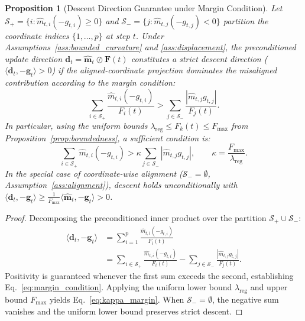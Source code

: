 \documentclass[11pt,a4paper]{article}
\newtheorem{proposition}{Proposition}
\begin{document}
\begin{proposition}[Descent Direction Guarantee under Margin Condition]
\label{prop:descent}
Let $\mathcal{S}_+ = \{i : \hat{m}_{t,i}(-g_{t,i}) \ge 0\}$ and $\mathcal{S}_- = \{j : \hat{m}_{t,j}(-g_{t,j}) < 0\}$ partition the coordinate indices $\{1, \dots, p\}$ at step $t$. Under Assumptions~\ref{ass:bounded_curvature} and \ref{ass:displacement}, the preconditioned update direction $\mathbf{d}_t = \hat{\mathbf{m}}_t \oslash \mathbf{F}(t)$ constitutes a strict descent direction ($\langle \mathbf{d}_t, -\mathbf{g}_t \rangle > 0$) if the aligned-coordinate projection dominates the misaligned contribution according to the margin condition:
\begin{equation}
\sum_{i \in \mathcal{S}_+} \frac{\hat{m}_{t,i} (-g_{t,i})}{F_i(t)} > \sum_{j \in \mathcal{S}_-} \frac{|\hat{m}_{t,j} g_{t,j}|}{F_j(t)}.
\label{eq:margin_condition}
\end{equation}
In particular, using the uniform bounds $\lambda_{\text{reg}} \le F_k(t) \le F_{\max}$ from Proposition~\ref{prop:boundedness}, a sufficient condition is:
\begin{equation}
\sum_{i \in \mathcal{S}_+} \hat{m}_{t,i} (-g_{t,i}) > \kappa \sum_{j \in \mathcal{S}_-} |\hat{m}_{t,j} g_{t,j}|, \qquad \kappa = \frac{F_{\max}}{\lambda_{\text{reg}}}.
\label{eq:kappa_margin}
\end{equation}
In the special case of coordinate-wise alignment ($\mathcal{S}_- = \emptyset$, Assumption~\ref{ass:alignment}), descent holds unconditionally with $\langle \mathbf{d}_t, -\mathbf{g}_t \rangle \ge \frac{1}{F_{\max}} \langle \hat{\mathbf{m}}_t, -\mathbf{g}_t \rangle > 0$.
\end{proposition}

\begin{proof}
Decomposing the preconditioned inner product over the partition $\mathcal{S}_+ \cup \mathcal{S}_-$:
\begin{align}
\langle \mathbf{d}_t, -\mathbf{g}_t \rangle &= \sum_{i=1}^p \frac{\hat{m}_{t,i}(-g_{t,i})}{F_i(t)} \nonumber \\
&= \sum_{i \in \mathcal{S}_+} \frac{\hat{m}_{t,i}(-g_{t,i})}{F_i(t)} - \sum_{j \in \mathcal{S}_-} \frac{|\hat{m}_{t,j} g_{t,j}|}{F_j(t)}.
\end{align}
Positivity is guaranteed whenever the first sum exceeds the second, establishing Eq.~\eqref{eq:margin_condition}. Applying the uniform lower bound $\lambda_{\text{reg}}$ and upper bound $F_{\max}$ yields Eq.~\eqref{eq:kappa_margin}. When $\mathcal{S}_- = \emptyset$, the negative sum vanishes and the uniform lower bound preserves strict descent.
\end{proof}
\end{document}
